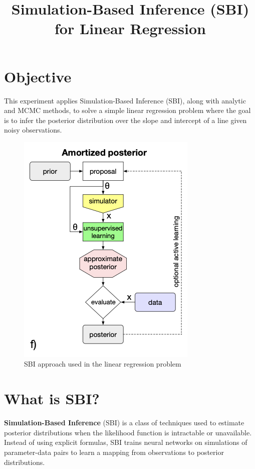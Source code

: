 \documentclass{article}
\title{Simulation-Based Inference (SBI) for Linear Regression}
\author{}
\date{}
\begin{document}
\maketitle

\section*{Objective}
This experiment applies Simulation-Based Inference (SBI), along with analytic and MCMC methods, to solve a simple linear regression problem where the goal is to infer the posterior distribution over the slope and intercept of a line given noisy observations.

\begin{figure}[h]
    \centering
    \includegraphics{SBIapproach.png}
    \caption{SBI approach used in the linear regression problem}
\end{figure}
\section*{What is SBI?}
\textbf{Simulation-Based Inference} (SBI) is a class of techniques used to estimate posterior distributions when the likelihood function is intractable or unavailable. Instead of using explicit formulas, SBI trains neural networks on simulations of parameter-data pairs to learn a mapping from observations to posterior distributions.
\end{document}
